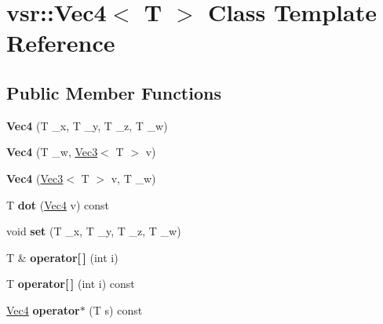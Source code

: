 \hypertarget{classvsr_1_1_vec4}{\section{vsr\-:\-:Vec4$<$ T $>$ Class Template Reference}
\label{classvsr_1_1_vec4}
}
\subsection*{Public Member Functions}
\begin{DoxyCompactItemize}
\item 
\hypertarget{classvsr_1_1_vec4_a63423d2bcba7087954ab60e3dee6cfe9}{{\bfseries Vec4} (T \-\_\-x, T \-\_\-y, T \-\_\-z, T \-\_\-w)}\label{classvsr_1_1_vec4_a63423d2bcba7087954ab60e3dee6cfe9}

\item 
\hypertarget{classvsr_1_1_vec4_ae82f41b608582f46aca03dabd88a7ece}{{\bfseries Vec4} (T \-\_\-w, \hyperlink{classvsr_1_1_vec3}{Vec3}$<$ T $>$ v)}\label{classvsr_1_1_vec4_ae82f41b608582f46aca03dabd88a7ece}

\item 
\hypertarget{classvsr_1_1_vec4_ad1955d63f5118bcf5bbdf5208c7f06d7}{{\bfseries Vec4} (\hyperlink{classvsr_1_1_vec3}{Vec3}$<$ T $>$ v, T \-\_\-w)}\label{classvsr_1_1_vec4_ad1955d63f5118bcf5bbdf5208c7f06d7}

\item 
\hypertarget{classvsr_1_1_vec4_a76bf9d3ec798cf468eed980a470a0a22}{T {\bfseries dot} (\hyperlink{classvsr_1_1_vec4}{Vec4} v) const }\label{classvsr_1_1_vec4_a76bf9d3ec798cf468eed980a470a0a22}

\item 
\hypertarget{classvsr_1_1_vec4_a891aa7412c26d4b7b8c9880344a1c5c5}{void {\bfseries set} (T \-\_\-x, T \-\_\-y, T \-\_\-z, T \-\_\-w)}\label{classvsr_1_1_vec4_a891aa7412c26d4b7b8c9880344a1c5c5}

\item 
\hypertarget{classvsr_1_1_vec4_a89d5e6f53135c68bdf36b8464ad6d707}{T \& {\bfseries operator\mbox{[}$\,$\mbox{]}} (int i)}\label{classvsr_1_1_vec4_a89d5e6f53135c68bdf36b8464ad6d707}

\item 
\hypertarget{classvsr_1_1_vec4_ac8b4e5517bfd8b988cefe84798e40b87}{T {\bfseries operator\mbox{[}$\,$\mbox{]}} (int i) const }\label{classvsr_1_1_vec4_ac8b4e5517bfd8b988cefe84798e40b87}

\item 
\hypertarget{classvsr_1_1_vec4_ae6c058c08b34018e798a64be3929e9e7}{\hyperlink{classvsr_1_1_vec4}{Vec4} {\bfseries operator$\ast$} (T s) const }\label{classvsr_1_1_vec4_ae6c058c08b34018e798a64be3929e9e7}


\end{DoxyCompactItemize}
